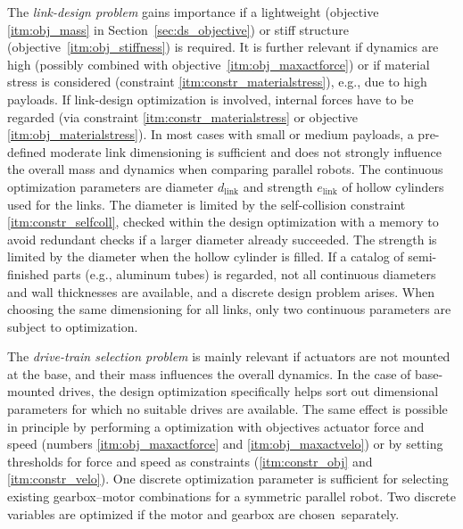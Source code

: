The \emph{link-design problem} gains importance if a lightweight (objective \ref{itm:obj_mass} in Section~\ref{sec:ds_objective}) or stiff structure (objective~\ref{itm:obj_stiffness}) is required.
It is further relevant if dynamics are high (possibly combined with objective~\ref{itm:obj_maxactforce}) or if material stress is considered (constraint \ref{itm:constr_materialstress}), e.g., due to high payloads.
If link-design optimization is {involved,} internal forces have to be regarded (via constraint \ref{itm:constr_materialstress} or objective \ref{itm:obj_materialstress}).
In most cases with small or medium payloads, a pre-defined moderate link dimensioning is sufficient and does not strongly influence the overall mass and dynamics when comparing parallel robots.
%
The continuous optimization parameters are diameter $d_\mathrm{link}$ and strength $e_\mathrm{link}$ of hollow cylinders used for the links.
The diameter is limited by the self-collision constraint \ref{itm:constr_selfcoll}, checked within the design optimization with a memory to avoid redundant checks if a larger diameter already succeeded.
The strength is limited by the diameter when the hollow cylinder is filled.
If a catalog of semi-finished parts (e.g., aluminum tubes) is regarded, not all continuous diameters and wall thicknesses are available, and a discrete design problem arises.
When choosing the same dimensioning for all links, only two continuous parameters are subject to optimization.
%

The \emph{drive-train selection problem} is mainly relevant if actuators are not mounted at the base, and their mass influences the overall dynamics.
In the case of base-mounted drives, the design optimization specifically helps sort out dimensional parameters for which no suitable drives are available.
The same effect is possible in principle by performing a  optimization with objectives actuator force and speed (numbers \ref{itm:obj_maxactforce} and \ref{itm:obj_maxactvelo}) or by setting thresholds for force and speed as constraints (\ref{itm:constr_obj} and \ref{itm:constr_velo}).
One discrete optimization parameter is sufficient for selecting existing gearbox--motor combinations for a symmetric parallel robot.
Two discrete variables are optimized if the motor and gearbox are chosen~separately.

